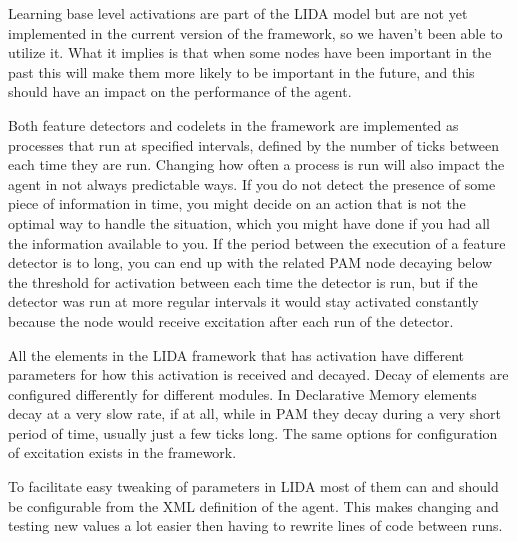 Learning base level activations are part of the LIDA model but are not yet implemented in the current version of the framework, so we haven't been able to utilize it. What it implies is that when some nodes have been important in the past this will make them more likely to be important in the future, and this should have an impact on the performance of the agent.

Both feature detectors and codelets in the framework are implemented as processes that run at specified intervals, defined by the number of ticks between each time they are run. Changing how often a process is run will also impact the agent in not always predictable ways. If you do not detect the presence of some piece of information in time, you might decide on an action that is not the optimal way to handle the situation, which you might have done if you had all the information available to you. If the period between the execution of a feature detector is to long, you can end up with the related PAM node decaying below the threshold for activation between each time the detector is run, but if the detector was run at more regular intervals it would stay activated constantly because the node would receive excitation after each run of the detector.

All the elements in the LIDA framework that has activation have different parameters for how this activation is received and decayed. Decay of elements are configured differently for different modules. In Declarative Memory elements decay at a very slow rate, if at all, while in PAM they decay during a very short period of time, usually just a few ticks long. The same options for configuration of excitation exists in the framework.

To facilitate easy tweaking of parameters in LIDA most of them can and should be configurable from the XML definition of the agent. This makes changing and testing new values a lot easier then having to rewrite lines of code between runs.
